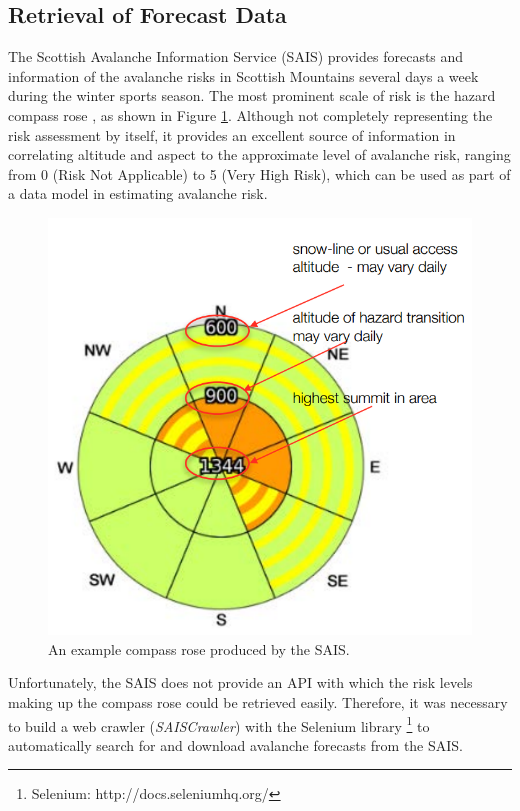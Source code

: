 \documentclass[11pt, oneside]{article}
\begin{document}
	\subsection{Retrieval of Forecast Data}
		The Scottish Avalanche Information Service (SAIS)\cite{sais} provides forecasts and information of the avalanche risks in Scottish Mountains several days a week during the winter sports season. The most prominent scale of risk is the hazard compass rose \cite[p. 4]{sais-report}, as shown in Figure \ref{fig:compassrose}. Although not completely representing the risk assessment by itself, it provides an excellent source of information in correlating altitude and aspect to the approximate level of avalanche risk, ranging from 0 (Risk Not Applicable) to 5 (Very High Risk), which can be used as part of a data model in estimating avalanche risk.
		\begin{figure}[h]
		\centering
		\includegraphics[scale=0.3]{CompassRose.png}
		\caption{\label{fig:compassrose}An example compass rose produced by the SAIS.\cite[p. 4]{sais-report}}
		\end{figure}
		
		Unfortunately, the SAIS does not provide an API with which the risk levels making up the compass rose could be retrieved easily. Therefore, it was necessary to build a web crawler (\textit{SAISCrawler}) with the Selenium library \footnote{Selenium: http://docs.seleniumhq.org/} to automatically search for and download avalanche forecasts from the SAIS.
		
\end{document}
